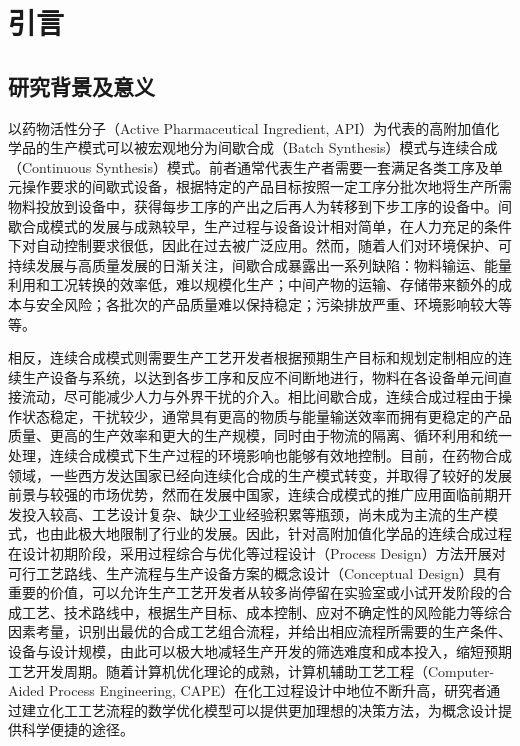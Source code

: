 
\chapter{引言}

\section{研究背景及意义}

以药物活性分子（Active Pharmaceutical Ingredient, API）为代表的高附加值化学品的生产模式可以被宏观地分为间歇合成（Batch Synthesis）模式与连续合成（Continuous Synthesis）模式。前者通常代表生产者需要一套满足各类工序及单元操作要求的间歇式设备，根据特定的产品目标按照一定工序分批次地将生产所需物料投放到设备中，获得每步工序的产出之后再人为转移到下步工序的设备中。间歇合成模式的发展与成熟较早，生产过程与设备设计相对简单，在人力充足的条件下对自动控制要求很低，因此在过去被广泛应用。然而，随着人们对环境保护、可持续发展与高质量发展的日渐关注，间歇合成暴露出一系列缺陷：物料输运、能量利用和工况转换的效率低，难以规模化生产；中间产物的运输、存储带来额外的成本与安全风险；各批次的产品质量难以保持稳定；污染排放严重、环境影响较大等等\cite{plumb2005,singh2012}。

相反，连续合成模式则需要生产工艺开发者根据预期生产目标和规划定制相应的连续生产设备与系统，以达到各步工序和反应不间断地进行，物料在各设备单元间直接流动，尽可能减少人力与外界干扰的介入\cite{cole2018}。相比间歇合成，连续合成过程由于操作状态稳定，干扰较少，通常具有更高的物质与能量输送效率而拥有更稳定的产品质量、更高的生产效率和更大的生产规模，同时由于物流的隔离、循环利用和统一处理，连续合成模式下生产过程的环境影响也能够有效地控制。目前，在药物合成领域，一些西方发达国家已经向连续化合成的生产模式转变，并取得了较好的发展前景与较强的市场优势\cite{markarian2021}，然而在发展中国家，连续合成模式的推广应用面临前期开发投入较高、工艺设计复杂、缺少工业经验积累等瓶颈，尚未成为主流的生产模式，也由此极大地限制了行业的发展。因此，针对高附加值化学品的连续合成过程在设计初期阶段，采用过程综合与优化等过程设计（Process Design）方法开展对可行工艺路线、生产流程与生产设备方案的概念设计（Conceptual Design）具有重要的价值，可以允许生产工艺开发者从较多尚停留在实验室或小试开发阶段的合成工艺、技术路线中，根据生产目标、成本控制、应对不确定性的风险能力等综合因素考量，识别出最优的合成工艺组合流程，并给出相应流程所需要的生产条件、设备与设计规模，由此可以极大地减轻生产开发的筛选难度和成本投入，缩短预期工艺开发周期\cite{smith1995}。随着计算机优化理论的成熟，计算机辅助工艺工程（Computer-Aided Process Engineering, CAPE）在化工过程设计中地位不断升高，研究者通过建立化工工艺流程的数学优化模型可以提供更加理想的决策方法，为概念设计提供科学便捷的途径。

